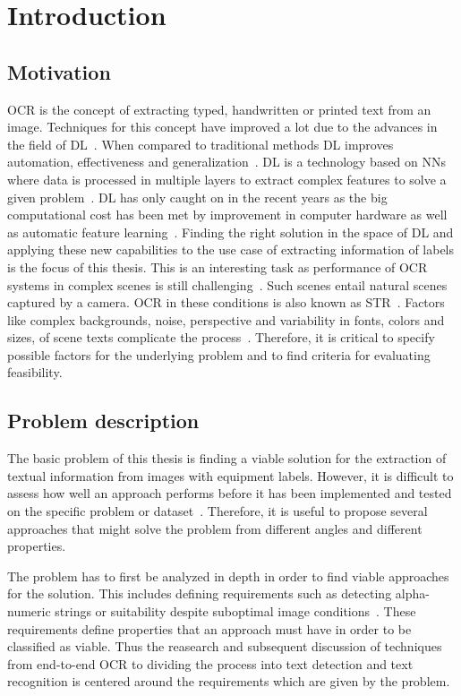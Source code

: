 \chapter{Introduction}\label{ch:intro}
\section{Motivation}
\ac{OCR} is the concept of extracting typed, handwritten or printed text
from an image.
Techniques for this concept have improved a lot due to the advances in the field of
\ac{DL}~\cite{zhao_improving_2020}.
When compared to traditional methods \ac{DL} improves automation, effectiveness and
generalization~\cite{chen_text_2021}.
\ac{DL} is a technology based on \acp{NN} where data is processed
in multiple layers to extract complex features to solve a given problem~\cite{shrestha_review_2019}.
\ac{DL} has only caught on in the recent years as the big computational cost has been met
by improvement in computer hardware as well as automatic feature
learning~\cite{ponti_everything_2017, chen_text_2021}.
Finding the right solution in the space of \ac{DL} and applying these new capabilities to
the use case of extracting information of labels is the focus of this thesis.
This is an interesting task as performance of \ac{OCR} systems in complex scenes is still
challenging~\cite{zhao_improving_2020}.
Such scenes entail natural scenes captured by a camera.
\ac{OCR} in these conditions is also known as \ac{STR}~\cite{chen_text_2021}.
Factors like complex backgrounds, noise, perspective and variability in fonts, colors and sizes,
of scene texts complicate the process~\cite{hu_gtc_2020,chen_text_2021}.
Therefore, it is critical to specify possible factors for the underlying problem and to find
criteria for evaluating feasibility.

\section{Problem description}\label{se:problem}
The basic problem of this thesis is finding a viable solution for the extraction of textual
information from images with equipment labels.
However, it is difficult to assess how well an approach performs before it has been implemented and
tested on the specific problem or dataset~\cite{arpteg_software_2018}.
Therefore, it is useful to propose several approaches that might solve the problem from
different angles and different properties.

The problem has to first be analyzed in depth in order to find viable approaches for the solution.
This includes defining requirements such as detecting alpha-numeric strings or suitability despite
suboptimal image conditions~\cite{ghosh_visual_2017, hu_gtc_2020}.
These requirements define properties that an approach must have in order to be classified as viable.
Thus the reasearch and subsequent discussion of techniques from end-to-end \ac{OCR} to dividing the
process into text detection and text recognition is centered around the requirements which are
given by the problem.

